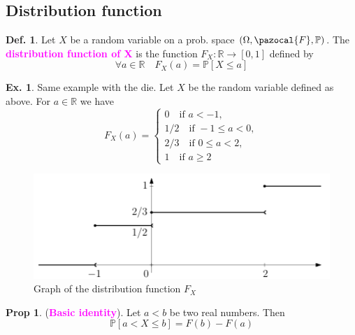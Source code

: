 \documentclass[8pt,a4paper,landscape]{article}
\theoremstyle{definition}
\newtheorem{definition}{Def.}[section]
\theoremstyle{example}
\newtheorem{example}{Ex.}[section]
\theoremstyle{intuition}
\theoremstyle{definition}
\newtheorem{proposition}{Prop}[section]
\newcommand{\Fb}{\pazocal{F}}
\newcommand{\mydef}[1]{\textcolor{magenta}{\textbf{#1}}}
\newcommand{\prob}[1]{\mathbb{P}\left[ #1 \right]}
\begin{document}
\begin{multicols}{3}
			
			\subsection{Distribution function}
			
				\begin{definition}
					Let $X$ be a random variable on a prob. space $(\Omega, \Fb, \mathbb{P})$. The \mydef{distribution function of X} is the function $F_X : \mathbb{R} \to \left[0,1\right]$ defined by
					$$
						\forall a \in \mathbb{R} \quad F_X(a) = \prob{X \leq a}
					$$
				\end{definition}
				
				\begin{example}
					Same example with the die. Let $X$ be the random variable defined as above. For $a \in \mathbb{R}$ we have 
					$$
						F_X(a) = \begin{cases}
							0 \quad \text{if } a < -1,\\
							1/2 \quad \text{if } -1 \leq a < 0, \\
							2/3 \quad \text{if } 0 \leq a < 2, \\
							1 \quad \text{if } a \geq 2
						\end{cases}
					$$
					\begin{figure}[H]
						\includegraphics[width=\linewidth]{distribution_function.png}
						\caption{Graph of the distribution function $F_X$}
					\end{figure}
				 \end{example}
				 
				 \begin{proposition}
				 	(\mydef{Basic identity}). Let $a < b$ be two real numbers. Then 
				 	$$
				 		\prob{a < X \leq b} = F(b) - F(a)
				 	$$
				 \end{proposition}
				 

\end{multicols}
\end{document}
